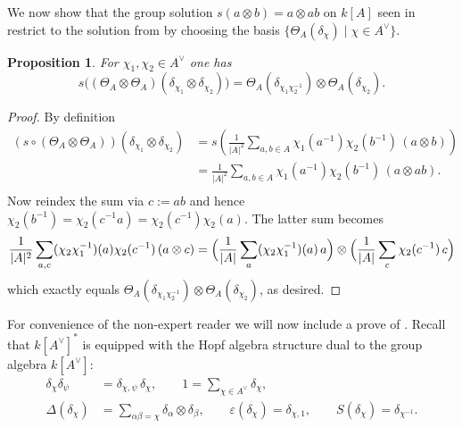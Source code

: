 \documentclass[a4paper,10pt]{amsart}
\newtheorem{proposition}[lemma]{Proposition}
\theoremstyle{definition}
\theoremstyle{remark}
\newcommand\D{\Delta}
\newcommand\ot{\otimes}
\begin{document}
We now show that the group solution $s(a \ot b) = a \ot ab$ on $k[A]$ seen in  restrict to the solution from  by choosing the basis $\{ \Theta_A(\delta_{\chi}) \mid \chi \in A^{\vee} \}$.

\begin{proposition}\label{prop:s2Theta}
For $\chi_1,\chi_2\in A^\vee$ one has
\[
s\bigl((\Theta_A\otimes\Theta_A)(\delta_{\chi_1}\otimes \delta_{\chi_2})\bigr)
=\Theta_A(\delta_{\chi_1\chi_2^{-1}})\otimes \Theta_A(\delta_{\chi_2}).
\]
\end{proposition}

\begin{proof}
By definition
\begin{align*}
(s\circ(\Theta_A\otimes\Theta_A))(\delta_{\chi_1}\otimes\delta_{\chi_2})
 & =s \left( \frac1{|A|^2}\sum_{a,b\in A}\chi_1(a^{-1})\chi_2(b^{-1})\,(a\otimes b) \right)\\
 & =\frac1{|A|^2}\sum_{a,b\in A}\chi_1(a^{-1})\chi_2(b^{-1})\,(a\otimes ab). \\
\end{align*}
Now reindex the sum via $c:=ab$ and hence $\chi_2(b^{-1})=\chi_2(c^{-1}a)=\chi_2(c^{-1})\chi_2(a)$. The latter sum becomes
\[
\frac1{|A|^2}\sum_{a,c}(\chi_2\chi_1^{-1})(a)\chi_2(c^{-1})\,(a\otimes c)
=\Bigl(\frac1{|A|}\sum_{a}(\chi_2\chi_1^{-1})(a)\,a\Bigr)\otimes\Bigl(\frac1{|A|}\sum_c\chi_2(c^{-1})\,c\Bigr)
\]
which exactly equals $\Theta_A(\delta_{\chi_1\chi_2^{-1}})\otimes \Theta_A(\delta_{\chi_2})$, as desired.
\end{proof}

For convenience of the non-expert reader we will now include a prove of .  Recall that $k[A^\vee]^*$ is equipped with the Hopf algebra structure dual to the group algebra $k[A^\vee]$:
\begin{align*}
\delta_\chi\delta_\psi &= \delta_{\chi,\psi}\,\delta_\chi,\qquad 1=\sum_{\chi\in A^\vee}\delta_\chi,\\
\D(\delta_\chi) &= \sum_{\alpha\beta=\chi}\delta_\alpha\otimes \delta_\beta,\qquad
\varepsilon(\delta_\chi)=\delta_{\chi,1},\qquad
S(\delta_\chi)=\delta_{\chi^{-1}}.
\end{align*}
\end{document}
